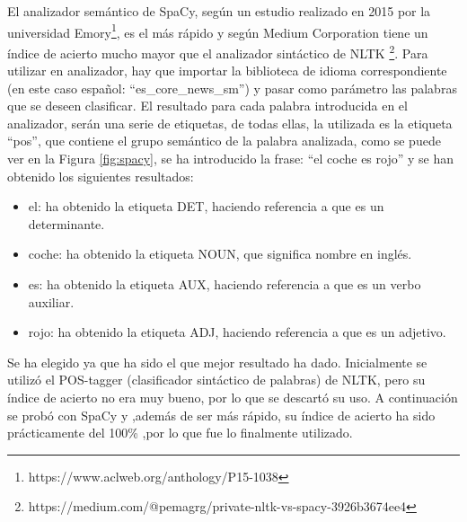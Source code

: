 El analizador semántico de SpaCy, según un estudio realizado en 2015 por la universidad Emory\footnote{https://www.aclweb.org/anthology/P15-1038}, es el más rápido y según Medium Corporation tiene un índice de acierto mucho mayor que el analizador sintáctico de NLTK \footnote{https://medium.com/@pemagrg/private-nltk-vs-spacy-3926b3674ee4}. Para utilizar en analizador, hay que importar la biblioteca de idioma correspondiente (en este caso español: ``es\_core\_news\_sm'') y pasar como parámetro las palabras que se deseen clasificar. El resultado para cada palabra introducida en el analizador, serán una serie de etiquetas, de todas ellas, la utilizada es la etiqueta ``pos'', que contiene el grupo semántico de la palabra analizada, como se puede ver en la Figura \ref{fig:spacy}, se ha introducido la frase: ``el coche es rojo'' y se han obtenido los siguientes resultados:
\begin{itemize}
	\item el: ha obtenido la etiqueta DET, haciendo referencia a que es un determinante.
	\item coche: ha obtenido la etiqueta NOUN, que significa nombre en inglés.
	\item es: ha obtenido la etiqueta AUX, haciendo referencia a que es un verbo auxiliar.
	\item rojo: ha obtenido la etiqueta ADJ, haciendo referencia a que es un adjetivo.
\end{itemize}

Se ha elegido ya que ha sido el que mejor resultado ha dado. Inicialmente se utilizó el POS-tagger (clasificador sintáctico de palabras) de NLTK, pero su índice de acierto no era muy bueno, por lo que se descartó su uso. A continuación se probó con SpaCy y ,además de ser más rápido, su índice de acierto ha sido prácticamente del 100\% ,por lo que fue lo finalmente utilizado.

